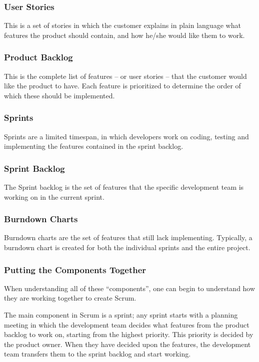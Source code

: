 \subsubsection{User Stories}
This is a set of stories in which the customer explains in plain language what features the product should contain, and how he/she would like them to work.

\subsubsection{Product Backlog}
This is the complete list of features -- or user stories -- that the customer would like the product to have.
Each feature is prioritized to determine the order of which these should be implemented.

\subsubsection{Sprints}
Sprints are a limited timespan, in which developers work on coding, testing and implementing the features contained in the sprint backlog.

\subsubsection{Sprint Backlog}
The Sprint backlog is the set of features that the specific development team is working on in the current sprint.

\subsubsection{Burndown Charts}
Burndown charts are the set of features that still lack implementing. Typically, a burndown chart is created for both the individual sprints and the entire project.

\subsubsection{Putting the Components Together}
When understanding all of these ``components'', one can begin to understand how they are working together to create Scrum.

The main component in Scrum is a sprint;
any sprint starts with a planning meeting in which the development team decides what features from the product backlog to work on, starting from the highest priority. 
This priority is decided by the product owner. 
When they have decided upon the features, the development team transfers them to the sprint backlog and start working.

